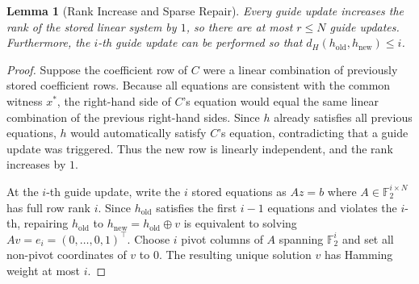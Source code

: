 \documentclass[11pt,a4paper]{article}
\newtheorem{lemma}[theorem]{Lemma}
\theoremstyle{definition}
\theoremstyle{remark}
\newcommand{\F}{\mathbb{F}}
\newcommand{\xor}{\oplus}
\begin{document}
\begin{lemma}[Rank Increase and Sparse Repair]\label{lem:repair}
Every guide update increases the rank of the stored linear system by $1$, so there are at most $r \le N$ guide updates. Furthermore, the $i$-th guide update can be performed so that $d_H(h_{\mathrm{old}}, h_{\mathrm{new}}) \le i$.
\end{lemma}

\begin{proof}
Suppose the coefficient row of $C$ were a linear combination of previously stored coefficient rows. Because all equations are consistent with the common witness $x^*$, the right-hand side of $C$'s equation would equal the same linear combination of the previous right-hand sides. Since $h$ already satisfies all previous equations, $h$ would automatically satisfy $C$'s equation, contradicting that a guide update was triggered. Thus the new row is linearly independent, and the rank increases by $1$.

At the $i$-th guide update, write the $i$ stored equations as $A z = b$ where $A \in \F_2^{i \times N}$ has full row rank $i$. Since $h_{\mathrm{old}}$ satisfies the first $i-1$ equations and violates the $i$-th, repairing $h_{\mathrm{old}}$ to $h_{\mathrm{new}} = h_{\mathrm{old}} \xor v$ is equivalent to solving $A v = e_i = (0,\dots,0,1)^\top$. Choose $i$ pivot columns of $A$ spanning $\F_2^i$ and set all non-pivot coordinates of $v$ to $0$. The resulting unique solution $v$ has Hamming weight at most $i$.
\end{proof}
\end{document}
